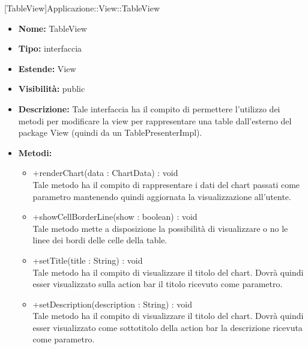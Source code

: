 			
			[TableView]{Applicazione::View::TableView}
			

	
			
			\begin{itemize}
			\item \textbf{Nome:} TableView
			\item \textbf{Tipo:} interfaccia
			
		\item \textbf{Estende:}
		View
			\item \textbf{Visibilità:} public
			\item \textbf{Descrizione:} Tale interfaccia ha il compito di permettere l'utilizzo dei metodi per modificare la view per rappresentare una table dall'esterno del package View (quindi da un TablePresenterImpl).
			\item \textbf{Metodi:}
				\begin{itemize}
				\setlength{\itemsep}{5pt}
				
					\item[\ding{111}] {{+renderChart(data : ChartData) : void}} \\ [1mm] Tale metodo ha il compito di rappresentare i dati del chart passati come parametro mantenendo quindi aggiornata la visualizzazione all'utente.
					\item[\ding{111}] {{+showCellBorderLine(show : boolean) : void}} \\ [1mm] Tale metodo mette a disposizione la possibilità di visualizzare o no le linee dei bordi delle celle della table.
					\item[\ding{111}] {{+setTitle(title : String) : void}} \\ [1mm] Tale metodo ha il compito di visualizzare il titolo del chart. Dovrà quindi esser visualizzato sulla action bar il titolo ricevuto come parametro.
					\item[\ding{111}] {{+setDescription(description : String) : void}} \\ [1mm] Tale metodo ha il compito di visualizzare il titolo del chart. Dovrà quindi esser visualizzato come sottotitolo della action bar la descrizione ricevuta come parametro.
				\end{itemize}
		
			\end{itemize}


